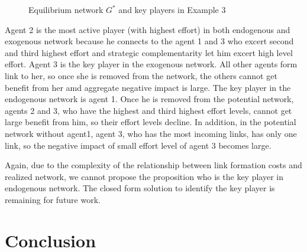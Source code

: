 \documentclass[12pt]{article}
\theoremstyle{definition}
\begin{document}
\begin{figure}[h]
\caption{Equilibrium network $G^{*}$ and key players in Example 3} \label{fig:ex3}
\end{figure}

Agent 2 is the most active player (with highest effort) in both endogenous and exogenous network because he connects to the agent 1 and 3 who excert second and third highest effort and strategic complementarity let him excert high level effort.
Agent 3 is the key player in the exogenous network.
All other agents form link to her, so once she is removed from the network, the others cannot get benefit from her amd aggregate negative impact is large.
The key player in the endogenous network is agent 1.
Once he is removed from the potential network, agents 2 and 3, who have the highest and third highest effort levels, cannot get large benefit from him, so their effort levels decline.
In addition, in the potential network without agent1, agent 3, who has the most incoming links, has only one link, so the negative impact of small effort level of agent 3 becomes large.

Again, due to the complexity of the relationship between link formation costs and realized network, we cannot propose the proposition who is the key player in endogenous network.
The closed form solution to identify the key player is remaining for future work.


\section{Conclusion}
\end{document}
